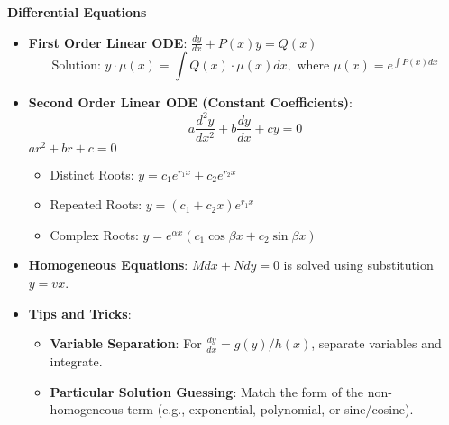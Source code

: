 \documentclass[a4paper,10pt]{article}
\begin{document}
\textbf{Differential Equations}
\begin{itemize}
    \item \textbf{First Order Linear ODE}: \( \frac{dy}{dx} + P(x)y = Q(x) \)
    \[ \text{Solution: } y \cdot \mu(x) = \int Q(x) \cdot \mu(x) dx, \text{ where } \mu(x) = e^{\int P(x)dx} \]
    \item \textbf{Second Order Linear ODE (Constant Coefficients)}:
    \[ a\frac{d^2y}{dx^2} + b\frac{dy}{dx} + cy = 0 \]
     \( ar^2 + br + c = 0 \)
    \begin{itemize}
        \item Distinct Roots: \( y = c_1e^{r_1x} + c_2e^{r_2x} \)
        \item Repeated Roots: \( y = (c_1 + c_2x)e^{r_1x} \)
        \item Complex Roots: \( y = e^{\alpha x} (c_1\cos\beta x + c_2\sin\beta x) \)
    \end{itemize}
    \item \textbf{Homogeneous Equations}: \( Mdx + Ndy = 0 \) is solved using substitution \( y = vx \).
    \item \textbf{Tips and Tricks}:
    \begin{itemize}
        \item \textbf{Variable Separation}: For \( \frac{dy}{dx} = g(y)/h(x) \), separate variables and integrate.
        \item \textbf{Particular Solution Guessing}: Match the form of the non-homogeneous term (e.g., exponential, polynomial, or sine/cosine).
    \end{itemize}
\end{itemize}
\end{document}
